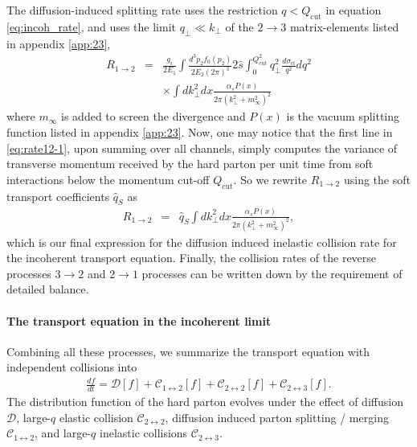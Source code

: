 \documentclass[aps, prc, reprint, amsmath, groupedaddress, nofootinbib]{revtex4-1}
\begin{document}
The diffusion-induced splitting rate uses the restriction $q<Q_{\textrm{cut}}$ in equation \ref{eq:incoh_rate}, and uses the limit $q_\perp \ll k_\perp$ of the $2\rightarrow 3$  matrix-elements listed in appendix \ref{app:23},
\begin{eqnarray}
R_{1\rightarrow 2} &=& \frac{g_i}{2E_1}\int  \frac{d^3p_2f_0(p_2)}{2E_2(2\pi)^3} 2\hat{s} \int_{0}^{Q_{\textrm{cut}}^2} q_\perp^2 \frac{d\sigma_{\textrm{el}}}{q^2} dq^2\\\nonumber
&& \times \int d k_\perp^2 dx \frac{\alpha_s P(x) }{2\pi (k_\perp^2 + m_\infty^2)^2} \label{eq:rate12-1}
\end{eqnarray}
where $m_\infty$ is added to screen the divergence and $P(x)$ is the vacuum splitting function listed in appendix \ref{app:23}.
Now, one may notice that the first line in \ref{eq:rate12-1}, upon summing over all channels, simply computes the variance of transverse momentum received by the hard parton per unit time from soft interactions below the momentum cut-off $Q_{\textrm{cut}}$.
So we rewrite $R_{1\rightarrow 2}$ using the soft transport coefficients $\hat{q}_{S}$ as
\begin{eqnarray}
R_{1\rightarrow 2} &=& \hat{q}_S\int d k_\perp^2 dx \frac{\alpha_s P(x) }{2\pi (k_\perp^2 + m_\infty^2)^2} \label{eq:rate12-2},
\end{eqnarray}
which is our final expression for the diffusion induced inelastic collision rate for the incoherent transport equation.
Finally, the collision rates of the reverse processes $3\rightarrow 2$ and $2\rightarrow 1$ processes can be written down by the requirement of detailed balance.

\paragraph{The transport equation in the incoherent limit}
Combining all these processes, we summarize the transport equation with independent collisions into
\begin{eqnarray}\label{eq:incoh_transport}
\frac{df}{dt} = \mathcal{D}[f] + \mathcal{C}_{1\leftrightarrow 2}[f] + \mathcal{C}_{2\leftrightarrow 2}[f] + \mathcal{C}_{2\leftrightarrow 3}[f].
\end{eqnarray}
The distribution function of the hard parton evolves under the effect of diffusion $\mathcal{D}$, large-$q$ elastic collision $\mathcal{C}_{2\leftrightarrow 2}$,  diffusion induced parton splitting / merging $\mathcal{C}_{1\leftrightarrow 2}$, and large-$q$ inelastic collisions $\mathcal{C}_{2\leftrightarrow 3}$. 
\end{document}
